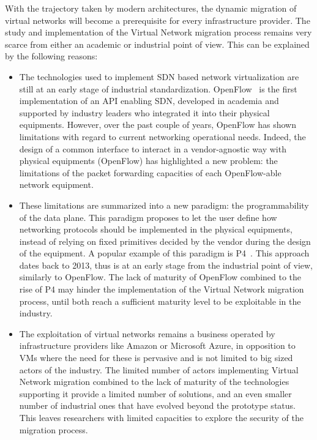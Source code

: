 With the trajectory taken by modern architectures, the dynamic migration of virtual networks will become a prerequisite for every infrastructure provider.
The study and implementation of the Virtual Network migration process remains very scarce from either an academic or industrial point of view. This can be explained by the following reasons:

\begin{itemize}
    \item The technologies used to implement SDN based network virtualization are still at an early stage of industrial standardization. OpenFlow~\cite{Openflow-McKeown2008} is the first implementation of an API enabling SDN, developed in academia and supported by industry leaders who integrated it into their physical equipments. However, over the past couple of years, OpenFlow has shown limitations with regard to current networking operational needs. Indeed, the design of a common interface to interact in a vendor-agnostic way with physical equipments (\ie OpenFlow) has highlighted a new problem: the limitations of the packet forwarding capacities of each OpenFlow-able network equipment. 
    
    \item These limitations are summarized into a new paradigm: the programmability of the data plane.
    This paradigm proposes to let the user define how networking protocols should be implemented in the physical equipments, instead of relying on fixed primitives decided by the vendor during the design of the equipment. A popular example of this paradigm is P4~\cite{P4}.
    This approach dates back to 2013, thus is at an early stage from the industrial point of view, similarly to OpenFlow.
    The lack of maturity of OpenFlow combined to the rise of P4 may hinder the implementation of the Virtual Network migration process, until both reach a sufficient maturity level to be exploitable in the industry.
    
    \item The exploitation of virtual networks remains a business operated by infrastructure providers like Amazon or Microsoft Azure, in opposition to VMs where the need for these is pervasive and is not limited to big sized actors of the industry. The limited number of actors implementing Virtual Network migration combined to the lack of maturity of the technologies supporting it provide a limited number of solutions, and an even smaller number of industrial ones that have evolved beyond the prototype status. This leaves researchers with limited capacities to explore the security of the migration process.
\end{itemize}

